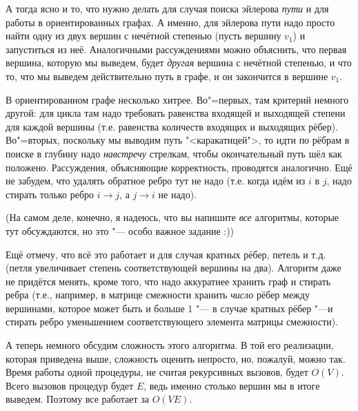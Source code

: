 А тогда ясно и то, что нужно делать для случая поиска эйлерова \textit{пути} и для работы в 
ориентированных графах. А именно, для эйлерова пути надо просто найти одну из двух вершин с 
нечётной степенью (пусть вершину $v_1$) и запуститься из неё. Аналогичными рассуждениями можно 
объяснить, что первая вершина, которую мы выведем, будет \textit{другая} вершина с нечётной 
степенью, и что то, что мы выведем действительно путь в графе, и он закончится в вершине $v_1$.

В ориентированном графе несколько хитрее. Во"=первых, там критерий немного другой: для цикла там надо 
требовать равенства входящей и выходящей степени для каждой вершины (т.е. равенства количеств 
входящих и выходящих рёбер). Во"=вторых, поскольку мы выводим путь "<каракатицей">, то идти по рёбрам в поиске 
в глубину надо \textit{навстречу} стрелкам, чтобы окончательный путь шёл как положено. Рассуждения, 
объясняющие корректность, проводятся аналогично. Ещё не забудем, что удалять обратное ребро тут не 
надо (т.е. когда идём из $i$ в $j$, надо стирать только ребро $i\to j$, а $j\to i$ не надо).


(На самом деле, конечно, я надеюсь, что вы напишите \textit{все} алгоритмы, которые тут 
обсуждаются, но это "--- особо важное задание :))


Ещё отмечу, что всё это работает и для случая кратных рёбер, петель и т.д. (петля увеличивает 
степень соответствующей вершины на два). Алгоритм даже не придётся менять, кроме того, что надо 
аккуратнее хранить граф и стирать ребра (т.е., например, в матрице смежности хранить \textit{число} 
рёбер между вершинами, которое может быть и больше 1 "--- в случае кратных рёбер "---и стирать 
ребро уменьшением соответствующего элемента матрицы смежности).

А теперь немного обсудим сложность этого алгоритма. В той его реализации, которая приведена выше, 
сложность оценить непросто, но, пожалуй, можно так. Время работы одной процедуры, не считая 
рекурсивных вызовов, будет $O(V)$. Всего вызовов процедур будет $E$, ведь именно столько вершин мы 
в итоге выведем. Поэтому все работает за $O(VE)$.


